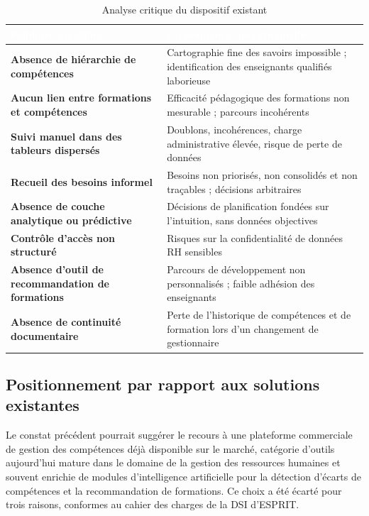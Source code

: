 \documentclass[12pt,a4paper]{report}
\renewcommand{\thead}[1]{\cellcolor{espritblue}\textcolor{white}{\textbf{#1}}}
\begin{document}
\begin{table}[H]
\centering
\caption{Analyse critique du dispositif existant}
\label{tab:critique_existant}
{\small\renewcommand{\arraystretch}{1.15}
\begin{tabularx}{\textwidth}{>{\bfseries}p{4.8cm} X}
\toprule
\thead{Faiblesse identifiée} & \thead{Conséquence opérationnelle} \\
\midrule
Absence de hiérarchie de compétences
  & Cartographie fine des savoirs impossible ; identification des enseignants qualifiés laborieuse \\
Aucun lien entre formations et compétences
  & Efficacité pédagogique des formations non mesurable ; parcours incohérents \\
Suivi manuel dans des tableurs dispersés
  & Doublons, incohérences, charge administrative élevée, risque de perte de données \\
Recueil des besoins informel
  & Besoins non priorisés, non consolidés et non traçables ; décisions arbitraires \\
Absence de couche analytique ou prédictive
  & Décisions de planification fondées sur l'intuition, sans données objectives \\
Contrôle d'accès non structuré
  & Risques sur la confidentialité de données RH sensibles \\
Absence d'outil de recommandation de formations
  & Parcours de développement non personnalisés ; faible adhésion des enseignants \\
Absence de continuité documentaire
  & Perte de l'historique de compétences et de formation lors d'un changement de gestionnaire \\
\bottomrule
\end{tabularx}}
\end{table}

\subsection{Positionnement par rapport aux solutions existantes}

Le constat précédent pourrait suggérer le recours à une plateforme commerciale de
gestion des compétences déjà disponible sur le marché, catégorie d'outils
aujourd'hui mature dans le domaine de la gestion des ressources humaines et
souvent enrichie de modules d'intelligence artificielle pour la détection
d'écarts de compétences et la recommandation de formations. Ce choix a été
écarté pour trois raisons, conformes au cahier des charges de la DSI d'ESPRIT.
\end{document}
